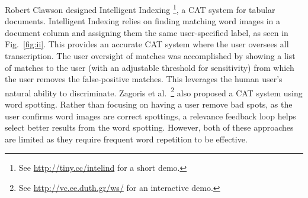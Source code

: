 \documentclass[conference]{IEEEtran}
\begin{document}
Robert Clawson designed Intelligent Indexing \cite{Clawson2014}\footnote{See \url{http://tiny.cc/intelind} for a short demo.}, a CAT system for tabular documents. Intelligent Indexing relies on finding matching word images in a document column and assigning them the same user-specified label, as seen in Fig.~\ref{fig:ii}. This provides an accurate CAT system where the user oversees all transcription. The user oversight of matches was accomplished by showing a list of matches to the user (with an adjustable threshold for sensitivity) from which the user removes the false-positive matches. This leverages the human user's natural ability to discriminate. Zagoris et al.~\cite{Zagoris2015}\footnote{See \url{http://vc.ee.duth.gr/ws/} for an interactive demo.} also proposed a CAT system using word spotting. Rather than focusing on having a user remove bad spots, as the user confirms word images are correct spottings, a relevance feedback loop helps select better results from the word spotting. However, both of these approaches are limited as they require frequent word repetition to be effective.
\end{document}

